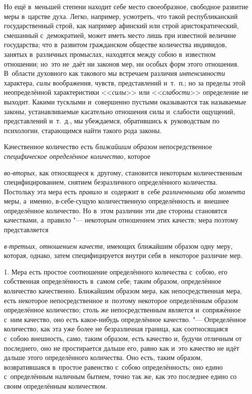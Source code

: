 Но ещё в~меньшей степени находит себе место своеобразное, свободное развитие
меры в~царстве духа. Легко, например, усмотреть, что такой республиканский
государственный строй, как например афинский или строй аристократический,
смешанный с~демократией, может иметь место лишь при известной величине
государства; что в~развитом гражданском обществе количества индивидов, занятых
в~различных промыслах, находятся между собою в~известном отношении; но~это
не~даёт ни законов мер, ни особых форм этого отношения. В~области духовного
как такового мы встречаем различия {\em интенсивности} характера, {\em силы}
воображения, чувств, представлений и~т.~п.; но за пределы этой неопределённой
характеристики <<{\em силы}>> или <<{\em слабости}>> определение не выходит.
Какими тусклыми и~совершенно пустыми оказываются так называемые законы,
устанавливаемые касательно отношения силы и~слабости ощущений, представлений
и~т.~д., мы убеждаемся, обратившись к~руководствам по психологии, старающимся
найти такого рода законы.


Качественное количество есть {\em ближайшим образом} непосредственное
{\em специфическое определённое количество,} которое

{\em во-вторых,} как относящееся к~другому, становится некоторым количественным
специфицированием, снятием безразличного определённого количества. Постольку
эта мера есть {\em правило} и~содержит в~себе {\em различенными оба момента}
меры, а~именно, в-себе-сущую количественную определённость и~внешнее
определённое количество. Но в~этом различии эти две стороны становятся
качествами, а~правило "--- некоторым отношением этих качеств; мера поэтому
представляется

{\em в-третьих, отношением качеств,} имеющих ближайшим образом одну меру,
которая, однако, затем специфицируется внутри себя в~некоторое различие мер.


1. Мера есть простое соотношение определённого количества с~собою, его
собственная определённость в~самом себе; таким образом, определённое количество
качественно. Ближайшим образом мера, как непосредственная мера, есть некоторое
непосредственное и~поэтому некоторое определённым образом определённое
количество; столь же непосредственным является и~сопряжённое с~ним качество,
оно есть какое-нибудь определённое качество. "--- Определённое количество, как
эта уже более не безразличная граница, как соотносящаяся с~собою внешность,
само, таким образом, есть качество и, будучи отличным от последнего, оно не
простирается дальше его, равно как и~это качество не идёт дальше этого
определённого количества. Оно есть, таким образом, возвратившаяся в~простое
равенство с~собою определённость; оно едино с~определённым наличным бытием,
точно так же, как это последнее едино со своим определённым количеством.

